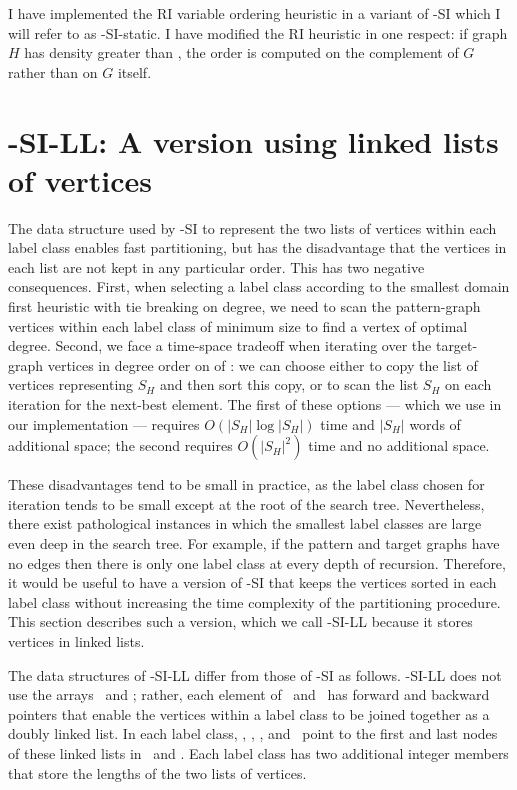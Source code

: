 I have implemented the RI variable ordering heuristic in a variant of \McSplit-SI
which I will refer to as \McSplit-SI-static.  I have modified the RI heuristic
in one respect: if graph $H$ has density greater than , the order
is computed on the complement of $G$ rather than on $G$ itself.

\section{\McSplit-SI-LL: A version using linked lists of vertices}\label{sec:mcsplit-si-ll}

The data structure used by \McSplit-SI to represent the two lists of vertices
within each label class enables fast partitioning, but has the disadvantage
that the vertices in each list are not kept in any particular order.  This has
two negative consequences.  First, when selecting a label class according to
the smallest domain first heuristic with tie breaking on degree, we need to
scan the pattern-graph vertices within each label class of minimum size to find
a vertex of optimal degree.  Second, we face a time-space tradeoff when
iterating over the target-graph vertices in degree order on
 of : we can choose either to copy
the list of vertices representing $S_H$ and then sort this copy, or to scan the
list $S_H$ on each iteration for the next-best element.  The first of these
options --- which we use in our implementation --- requires $O(|S_H| \log
|S_H|)$ time and $|S_H|$ words of additional space; the second requires
$O(|S_H|^2)$ time and no additional space.

These disadvantages tend to be small in practice, as the label class chosen for
iteration tends to be small except at the root of the search tree.
Nevertheless, there exist pathological instances in which the smallest label
classes are large even deep in the search tree.  For example, if the pattern
and target graphs have no edges then there is only one label class at every
depth of recursion.  Therefore, it would be useful to have a version of
\McSplit-SI that keeps the vertices sorted in each label class without increasing
the time complexity of the partitioning procedure.  This section describes
such a version, which we call \McSplit-SI-LL because it stores
vertices in linked lists.

The data structures of \McSplit-SI-LL differ from those of \McSplit-SI as
follows.  \McSplit-SI-LL does not use the arrays \Garray\ and \Harray; rather,
each element of \Gptrs\ and \Hptrs\ has forward and backward pointers that
enable the vertices within a label class to be joined together as a doubly
linked list.  In each label class, \varStartG, \varEndG, \varStartH, and
\varEndH\ point to the first and last nodes of these linked lists in \Gptrs\
and \Hptrs.  Each label class has two additional integer members that store the
lengths of the two lists of vertices.

